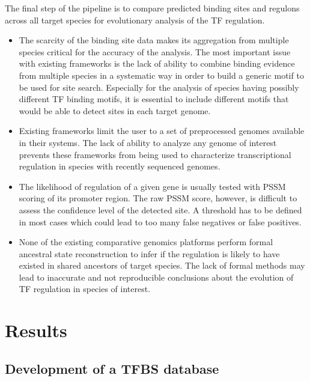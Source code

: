 \documentclass[12pt]{article}
\begin{document}
The final step of the pipeline is to compare predicted binding sites and
regulons across all target species for evolutionary analysis of the TF regulation.

\begin{itemize}
\item The scarcity of the binding site data makes its aggregation from multiple
  species critical for the accuracy of the analysis. The most important issue
  with existing frameworks is the lack of ability to combine binding evidence
  from multiple species in a systematic way in order to build a generic motif
  to be used for site search. Especially for the analysis of species having
  possibly different TF binding motifs, it is essential to include different
  motifs that would be able to detect sites in each target genome.

\item Existing frameworks limit the user to a set of preprocessed genomes
  available in their systems. The lack of ability to analyze any genome of
  interest prevents these frameworks from being used to characterize
  transcriptional regulation in species with recently sequenced genomes.

\item The likelihood of regulation of a given gene is usually tested with PSSM
  scoring of its promoter region. The raw PSSM score, however, is difficult to
  assess the confidence level of the detected site. A threshold has to be
  defined in most cases which could lead to too many false negatives or false
  positives.

\item None of the existing comparative genomics platforms perform formal
  ancestral state reconstruction to infer if the regulation is likely to have
  existed in shared ancestors of target species. The lack of formal methods may
  lead to inaccurate and not reproducible conclusions about the evolution of TF
  regulation in species of interest.
\end{itemize}

\section{Results}

\subsection{Development of a TFBS database}
\end{document}
